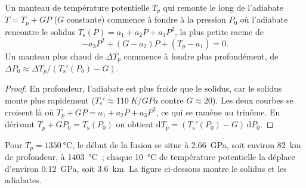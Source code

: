 \begin{proposition}\label{prop:b2:mantle-melting:onset}
Un manteau de température potentielle $T_p$ qui remonte le long de l'adiabate $T = T_p + GP$ ($G$
constante) commence à fondre à la pression $P_0$ où l'adiabate rencontre le
solidus $T_{\mathrm s}(P) = a_1 + a_2P + a_3P^2$, la plus petite racine de
\[
  -a_3P^2 + (G - a_2)P + (T_p - a_1) = 0 .
\]
Un manteau plus chaud de $\Delta T_p$ commence à fondre plus profondément, de $\Delta P_0 \approx
\Delta T_p/(T_{\mathrm s}'(P_0) - G)$.
\end{proposition}

\begin{proof}
En profondeur, l'adiabate est plus froide que le solidus, car le solidus monte plus
rapidement ($T_{\mathrm
s}' \approx \qty{110}{K/GPa}$ contre $G \approx 20$). Les deux courbes se croisent là où
$T_p + GP = a_1 + a_2P + a_3P^2$, ce qui se ramène au trinôme. En dérivant
$T_p + GP_0 = T_{\mathrm s}(P_0)$ on obtient $\mathrm dT_p = (T_{\mathrm s}'(P_0) -
G)\,\mathrm dP_0$.
\end{proof}

Pour $T_p = \qty{1350}{\celsius}$, le début de la fusion se situe à \qty{2.66}{GPa}, soit environ
\qty{82}{km} de profondeur, à \qty{1403}{\celsius}~; chaque \qty{10}{\celsius} de température
potentielle la déplace d'environ \qty{0.12}{GPa}, soit \qty{3.6}{km}. La figure ci-dessous
montre le solidus et les adiabates.

